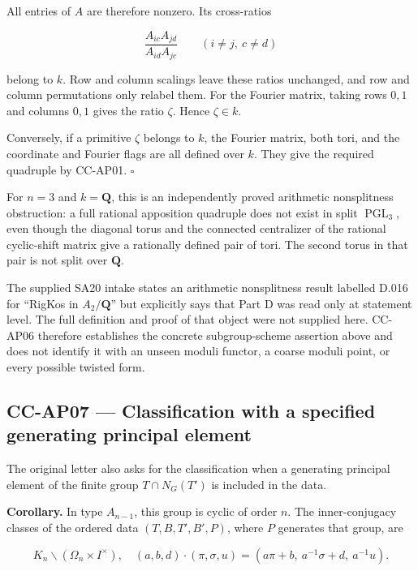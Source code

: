 All entries of \(A\) are therefore nonzero. Its cross-ratios

\[
 \frac{A_{ic}A_{jd}}{A_{id}A_{jc}}\qquad(i\ne j,\ c\ne d)
 \tag{CC-AP.12}
\]

belong to \(k\). Row and column scalings leave these ratios unchanged,
and row and column permutations only relabel them. For the Fourier
matrix, taking rows \(0,1\) and columns \(0,1\) gives the ratio
\(\zeta\). Hence \(\zeta\in k\).

Conversely, if a primitive \(\zeta\) belongs to \(k\), the Fourier
matrix, both tori, and the coordinate and Fourier flags are all defined
over \(k\). They give the required quadruple by CC-AP01. \(\square\)

For \(n=3\) and \(k=\mathbf Q\), this is an independently proved
arithmetic nonsplitness obstruction: a full rational apposition
quadruple does not exist in split \(\operatorname{PGL}_3\), even though
the diagonal torus and the connected centralizer of the rational
cyclic-shift matrix give a rationally defined pair of tori. The second
torus in that pair is not split over \(\mathbf Q\).

The supplied SA20 intake states an arithmetic nonsplitness result
labelled D.016 for ``RigKos in \(A_2/\mathbf Q\)'' but explicitly says
that Part D was read only at statement level. The full definition and
proof of that object were not supplied here. CC-AP06 therefore
establishes the concrete subgroup-scheme assertion above and does not
identify it with an unseen moduli functor, a coarse moduli point, or
every possible twisted form.

\subsection{CC-AP07 --- Classification with a specified generating
principal
element}\label{cc-ap07-classification-with-a-specified-generating-principal-element}

The original letter also asks for the classification when a generating
principal element of the finite group \(T\cap N_G(T')\) is included in
the data.

\textbf{Corollary.} In type \(A_{n-1}\), this group is cyclic of order
\(n\). The inner-conjugacy classes of the ordered data
\((T,B,T',B',P)\), where \(P\) generates that group, are

\[
 K_n\backslash(\Omega_n\times I^\times),
 \quad
 (a,b,d)\cdot(\pi,\sigma,u)
 =(a\pi+b,\ a^{-1}\sigma+d,\ a^{-1}u).
 \tag{CC-AP.13}
\]

